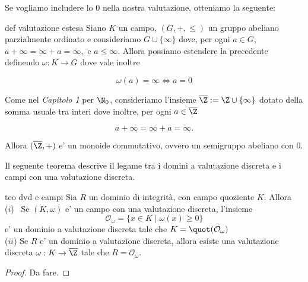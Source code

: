 \noindent Se vogliamo includere lo $0$ nella nostra valutazione, otteniamo la seguente:

\begin{defn}{def valutazione estesa}
  Siano $K$ un campo, $(G, +, \leq)$ un gruppo abeliano parzialmente ordinato e consideriamo $G \cup \{\infty\}$ dove, per ogni $a \in G$,
  $a+\infty = \infty + a=\infty,$ e $a \leq \infty$. Allora possiamo estendere la precedente definendo 
  $\omega : K \rightarrow G$ dove vale inoltre

  \[ \omega(a) = \infty \iff a=0 \]
\end{defn}

\begin{obs}
  Come nel \emph{Capitolo 1} per $\N_0$, consideriamo l'insieme $\overline{\Z} := \Z \cup \{ \infty \}$ 
  dotato della somma usuale tra interi dove inoltre, per ogni $a \in \overline{\Z}$

  \[ a + \infty = \infty + a = \infty. \]

  \noindent Allora $(\overline{\Z}, +)$ e' un monoide commutativo, ovvero un semigruppo abeliano con $0$.
\end{obs}

\noindent Il seguente teorema descrive il legame tra i domini a valutazione discreta e i campi con una valutazione discreta.

\begin{teo}[]{teo dvd e campi}
  Sia $R$ un dominio di integrità, con campo quoziente $K$. Allora\\
  ($i$) \ Se $(K,\omega)$ e' un campo con una valutazione discreta, l'insieme
    \[ \mathcal{O}_{\omega} = \{ x \in K \mid \omega(x) \geq 0 \} \]
  \noindent e' un dominio a valutazione discreta tale che $K = \quot(\mathcal{O}_{\omega})$\\

  \noindent ($ii$) Se $R$ e' un dominio a valutazione discreta, allora esiste una valutazione discreta $\omega : K \rightarrow \overline{\Z}$
  tale che $R = \mathcal{O}_{\omega}$.
\end{teo}
\begin{proof}
  Da fare.
\end{proof}

